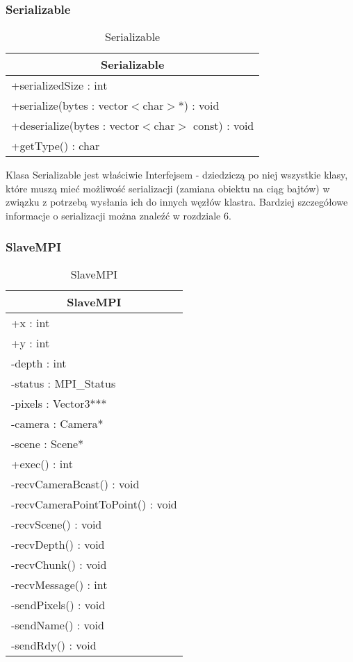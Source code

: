 \subsubsection{Serializable}

\footnotesize
\begin{longtable}{|p{14cm}|}
    \caption{Serializable} \label{tab:Serializable} \\ \hline
    \multicolumn{1}{|c|}{Serializable} \\ \hline
    +serializedSize : int \\ \hline
	+serialize(bytes : vector$<$char$>$*) : void \\ 
	+deserialize(bytes : vector$<$char$>$ const) : void \\
	+getType() : char \\
	\hline
\end{longtable}
\normalsize

Klasa Serializable jest właściwie Interfejsem - dziedziczą po niej wszystkie klasy, które muszą mieć możliwość serializacji (zamiana obiektu na ciąg bajtów) w związku z potrzebą wysłania ich do innych węzłów klastra. Bardziej szczegółowe informacje o serializacji można znaleźć w rozdziale 6.

\subsubsection{SlaveMPI}

\footnotesize
\begin{longtable}{|p{14cm}|}
    \caption{SlaveMPI} \label{tab:SlaveMPI} \\ \hline
    \multicolumn{1}{|c|}{SlaveMPI} \\ \hline
    +x : int \\ 
	+y : int \\
	-depth : int \\
	-status : MPI\_Status \\
	-pixels : Vector3*** \\
	-camera : Camera* \\
	-scene : Scene* \\ \hline
	+exec() : int \\
	-recvCameraBcast() : void \\
	-recvCameraPointToPoint() : void \\
	-recvScene() : void \\
	-recvDepth() : void \\
	-recvChunk() : void \\
	-recvMessage() : int \\
	-sendPixels() : void \\
	-sendName() : void \\
	-sendRdy() : void \\
	\hline
\end{longtable}
\normalsize

